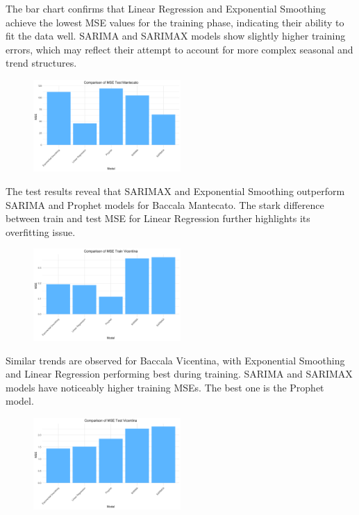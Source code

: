 \documentclass[10pt,twocolumn,letterpaper]{article}
\begin{document}
The bar chart confirms that Linear Regression and Exponential Smoothing achieve the lowest MSE values for the training phase, indicating their ability to fit the data well. SARIMA and SARIMAX models show slightly higher training errors, which may reflect their attempt to account for more complex seasonal and trend structures.

\begin{figure}[H]
    \centering
    \includegraphics[width=0.5\textwidth]{PlotsBEFD/plot_results_2-1.png} 
    \caption{}
    \label{fig:esempio}
\end{figure}

The test results reveal that SARIMAX and Exponential Smoothing outperform SARIMA and Prophet models for Baccala Mantecato. The stark difference between train and test MSE for Linear Regression further highlights its overfitting issue.

\begin{figure}[H]
    \centering
    \includegraphics[width=0.5\textwidth]{PlotsBEFD/plot_results_3-1.png} 
    \caption{}
    \label{fig:esempio}
\end{figure}

Similar trends are observed for Baccala Vicentina, with Exponential Smoothing and Linear Regression performing best during training. SARIMA and SARIMAX models have noticeably higher training MSEs. The best one is the Prophet model.

\begin{figure}[H]
    \centering
    \includegraphics[width=0.5\textwidth]{PlotsBEFD/plot_results_4-1.png} 
    \caption{}
    \label{fig:esempio}
\end{figure}
\end{document}
